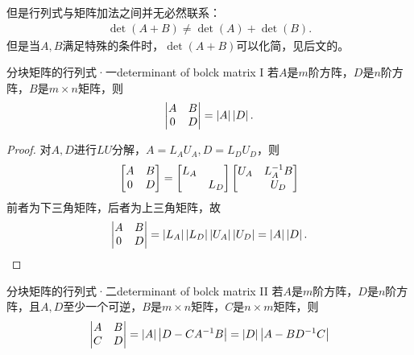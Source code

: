 但是行列式与矩阵加法之间并无必然联系：
\begin{align}
	\det(A+B)\neq\det(A)+\det(B).
\end{align}
但是当$A,B$满足特殊的条件时，$\det(A+B)$可以化简，见后文的。
\begin{theorem}{分块矩阵的行列式·一}{determinant of bolck matrix I}
	若$A$是$m$阶方阵，$D$是$n$阶方阵，$B$是$m\times n$矩阵，则
	\begin{align}
		\begin{vmatrix}
			A&B\\0&D
		\end{vmatrix}=\left\lvert A\right\rvert\left\lvert D\right\rvert.
	\end{align}
\end{theorem}
\begin{proof}
	对$A,D$进行$LU$分解，$A=L_AU_A,D=L_DU_D$，则
	\[
		\begin{bmatrix}
			A&B\\0&D
		\end{bmatrix}=
		\begin{bmatrix}
			L_A\\ &L_D
		\end{bmatrix}
		\begin{bmatrix}
			U_A&L_A^{-1} B\\ &U_D
		\end{bmatrix}
	\]
	前者为下三角矩阵，后者为上三角矩阵，故
	\[
		\begin{vmatrix}
			A&B\\0&D
		\end{vmatrix}=\left\lvert L_A\right\rvert\left\lvert L_D\right\rvert\left\lvert U_A\right\rvert\left\lvert U_D\right\rvert=\left\lvert A\right\rvert\left\lvert D\right\rvert.
		\qedhere
	\]
\end{proof}
\begin{theorem}{分块矩阵的行列式·二}{determinant of bolck matrix II}
	若$A$是$m$阶方阵，$D$是$n$阶方阵，且$A,D$至少一个可逆，$B$是$m\times n$矩阵，$C$是$n\times m$矩阵，则
	\begin{align}
		\begin{vmatrix}
			A&B\\C&D
		\end{vmatrix}=
		\left\lvert A\right\rvert\left\lvert D-CA^{-1} B\right\rvert=
		\left\lvert D\right\rvert\left\lvert A-BD^{-1} C\right\rvert
	\end{align}
\end{theorem}
